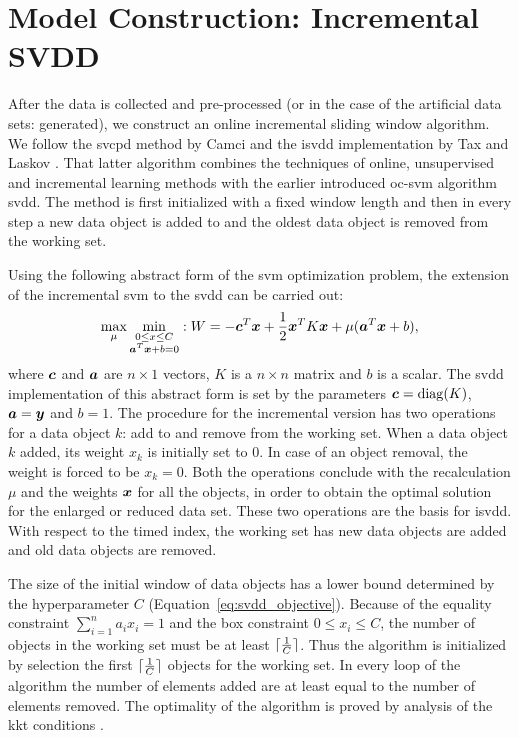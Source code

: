 \section{Model Construction: Incremental SVDD}\label{sec:method_model_construction}
After the data is collected and pre-processed (or in the case of the artificial data sets: generated), we construct an online incremental sliding window algorithm.
We follow the \gls{svcpd} method by Camci \cite{camci2010change} and the \gls{isvdd} implementation by Tax and Laskov \cite{tax2003online}.
That latter algorithm combines the techniques of online, unsupervised and incremental learning methods with the earlier introduced \gls{oc-svm} algorithm \gls{svdd}.
The method is first initialized with a fixed window length and then in every step a new data object is added to and the oldest data object is removed from the working set.

Using the following abstract form of the \gls{svm} optimization problem, the extension of the incremental \gls{svm} to the \gls{svdd} can be carried out:
\begin{equation}
  \operatorname*{max}_\mu \operatorname*{min}_{\substack{
    0 \le x \le C \\
    \vectorsym{a}^T \vectorsym{x} + b = 0}
  } : W = -\vectorsym{c}^T\vectorsym{x} + \frac{1}{2}\vectorsym{x}^T K\vectorsym{x} + \mu(\vectorsym{a}^T\vectorsym{x} + b),
\end{equation}
where $\vectorsym{c}$ and $\vectorsym{a}$ are $n \times 1$ vectors, $K$ is a $n \times n$ matrix and $b$ is a scalar.
The \gls{svdd} implementation of this abstract form is set by the parameters $\vectorsym{c}=\operatorname*{diag}(K)$, $\vectorsym{a} = \vectorsym{y}$ and $b=1$.
The procedure for the incremental version has two operations for a data object $k$: add to and remove from the working set.
When a data object $k$ added, its weight $x_k$ is initially set to $0$.
In case of an object removal, the weight is forced to be $x_k=0$.
Both the operations conclude with the recalculation $\mu$ and the weights $\vectorsym{x}$ for all the objects, in order to obtain the optimal solution for the enlarged or reduced data set.
These two operations are the basis for \gls{isvdd}.
With respect to the timed index, the working set has new data objects are added and old data objects are removed.

The size of the initial window of data objects has a lower bound determined by the hyperparameter $C$ (Equation~\ref{eq:svdd_objective}).
Because of the equality constraint $\sum_{i=1}^n a_i x_i = 1$ and the box constraint $0 \le x_i \le C$, the number of objects in the working set must be at least $\lceil\frac{1}{C}\rceil$.
Thus the algorithm is initialized by selection the first $\lceil\frac{1}{C}\rceil$ objects for the working set.
In every loop of the algorithm the number of elements added are at least equal to the number of elements removed.
The optimality of the algorithm is proved by analysis of the \gls{kkt} conditions \cite{tax2003online}.


